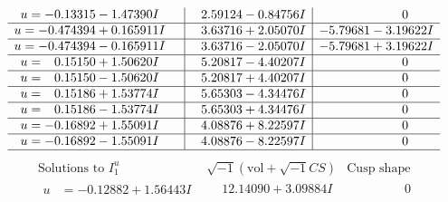 \documentclass[1p]{elsarticle_modified}
\theoremstyle{definition}
\newcommand{\I}{\sqrt{-1}}
\begin{document}
$$\begin{array}{c|c|c}
\begin{aligned}
u &= -0.13315 - 1.47390 I\end{aligned}
 & \phantom{-}2.59124 - 0.84756 I & \phantom{-0.000000 } 0 \\ \hline\begin{aligned}
u &= -0.474394 + 0.165911 I\end{aligned}
 & \phantom{-}3.63716 + 2.05070 I & -5.79681 - 3.19622 I \\ \hline\begin{aligned}
u &= -0.474394 - 0.165911 I\end{aligned}
 & \phantom{-}3.63716 - 2.05070 I & -5.79681 + 3.19622 I \\ \hline\begin{aligned}
u &= \phantom{-}0.15150 + 1.50620 I\end{aligned}
 & \phantom{-}5.20817 - 4.40207 I & \phantom{-0.000000 } 0 \\ \hline\begin{aligned}
u &= \phantom{-}0.15150 - 1.50620 I\end{aligned}
 & \phantom{-}5.20817 + 4.40207 I & \phantom{-0.000000 } 0 \\ \hline\begin{aligned}
u &= \phantom{-}0.15186 + 1.53774 I\end{aligned}
 & \phantom{-}5.65303 - 4.34476 I & \phantom{-0.000000 } 0 \\ \hline\begin{aligned}
u &= \phantom{-}0.15186 - 1.53774 I\end{aligned}
 & \phantom{-}5.65303 + 4.34476 I & \phantom{-0.000000 } 0 \\ \hline\begin{aligned}
u &= -0.16892 + 1.55091 I\end{aligned}
 & \phantom{-}4.08876 + 8.22597 I & \phantom{-0.000000 } 0 \\ \hline\begin{aligned}
u &= -0.16892 - 1.55091 I\end{aligned}
 & \phantom{-}4.08876 - 8.22597 I & \phantom{-0.000000 } 0\\
 \hline 
 \end{array}$$\newpage$$\begin{array}{c|c|c}  
\text{Solutions to }I^u_{1}& \I (\text{vol} + \sqrt{-1}CS) & \text{Cusp shape}\\
 \hline 
\begin{aligned}
u &= -0.12882 + 1.56443 I\end{aligned}
 & \phantom{-}12.14090 + 3.09884 I & \phantom{-0.000000 } 0 \\ \hline\begin{aligned}

\end{aligned}
\end{array}$$
\end{document}
